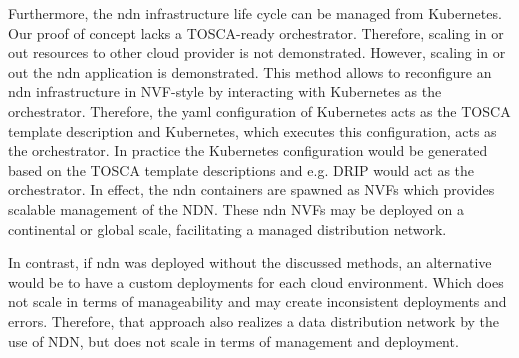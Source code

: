 Furthermore, the \gls{ndn} infrastructure life cycle can be managed from Kubernetes. Our proof of concept lacks a TOSCA-ready orchestrator. Therefore, scaling in or out resources to other cloud provider is not demonstrated. However, scaling in or out the \gls{ndn} application is demonstrated. This method allows to reconfigure an \gls{ndn} infrastructure in NVF-style by interacting with Kubernetes as the orchestrator. Therefore, the \gls{yaml} configuration of Kubernetes acts as the TOSCA template description and Kubernetes, which executes this configuration, acts as the orchestrator. In practice the Kubernetes configuration would be generated based on the TOSCA template descriptions and e.g. DRIP would act as the orchestrator. In effect, the \gls{ndn} containers are spawned as NVFs which provides scalable management of the NDN. These \gls{ndn} NVFs may be deployed on a continental or global scale, facilitating a managed distribution network.

In contrast, if \gls{ndn} was deployed without the discussed methods, an alternative would be to have a custom deployments for each cloud environment. Which does not scale in terms of manageability and may create inconsistent deployments and errors. Therefore, that approach also realizes a data distribution network by the use of NDN, but does not scale in terms of management and deployment.